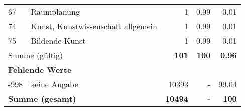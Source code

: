 \begin{longtable}{lXrrr}
        67 & \multicolumn{1}{X}{Raumplanung} & %
          \num{1} &
          \num[round-mode=places,round-precision=2]{0.99} &
          \num[round-mode=places,round-precision=2]{0.01} \\

        74 & \multicolumn{1}{X}{Kunst, Kunstwissenschaft allgemein} & %
          \num{1} &
          \num[round-mode=places,round-precision=2]{0.99} &
          \num[round-mode=places,round-precision=2]{0.01} \\

        75 & \multicolumn{1}{X}{Bildende Kunst} & %
          \num{1} &
          \num[round-mode=places,round-precision=2]{0.99} &
          \num[round-mode=places,round-precision=2]{0.01} \\

     \midrule
     \multicolumn{2}{l}{Summe (gültig)} &
       \textbf{\num{101}} &
     \textbf{\num{100}} &
       \textbf{\num[round-mode=places,round-precision=2]{0.96}} \\
     \multicolumn{5}{l}{\textbf{Fehlende Werte}}\\
       -998 &
       keine Angabe &
         \num{10393} &
        - &
         \num[round-mode=places,round-precision=2]{99.04} \\
     \midrule
     \multicolumn{2}{l}{\textbf{Summe (gesamt)}} &
          \textbf{\num{10494}} &
        \textbf{-} &
        \textbf{\num{100}} \\
     \bottomrule
     \end{longtable}
     
